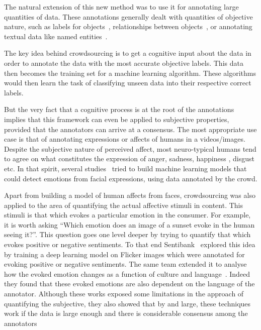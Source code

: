 The natural extension of this new method was to use it for annotating large quantities of data. These annotations generally dealt with quantities of objective nature, such as labels for objects~\cite{vondrick2013efficiently}, relationships between objects~\cite{krishna2017visual}, or annotating textual data like named entities~\cite{finin2010annotating}.

The key idea behind crowdsourcing is to get a cognitive input about the data in order to annotate the data with the most accurate objective labels. This data then becomes the training set for a machine learning algorithm. These algorithms would then learn the task of classifying unseen data into their respective correct labels. 

But the very fact that a cognitive process is at the root of the annotations implies that this framework can even be applied to subjective properties, provided that the annotators can arrive at a consensus. The most appropriate use case is that of annotating expressions or affects of humans in a videos/images. Despite the subjective nature of perceived affect, most neuro-typical humans tend to agree on what constitutes the expression of anger, sadness, happiness , disgust etc. In that spirit, several studies~\cite{tavares2016crowdsourcing,katsimerou2016crowdsourcing,kim2016vinereactor} tried to build machine learning models that could detect emotions from facial expressions, using data annotated by the crowd.

Apart from building a model of human affects from faces, crowdsourcing was also applied to the area of quantifying the actual affective stimuli in content. This stimuli is that which evokes a particular emotion in the consumer. For example, it is worth asking ``Which emotion does an image of a sunset evoke in the human seeing it?''. This question goes one level deeper by trying to quantify that which evokes positive or negative sentiments. To that end Sentibank~\cite{SentiBank} explored this idea by training a deep learning model on Flicker images which were annotated for evoking positive or negative sentiments. The same team extended it to analyse how the evoked emotion changes as a function of culture and language~\cite{pappas2016multilingual}. Indeed they found that these evoked emotions are also dependent on the language of the annotator. Although these works exposed some limitations in the approach of quantifying the subjective, they also showed that by and large, these techniques work if the data is large enough and there is considerable consensus among the annotators 


